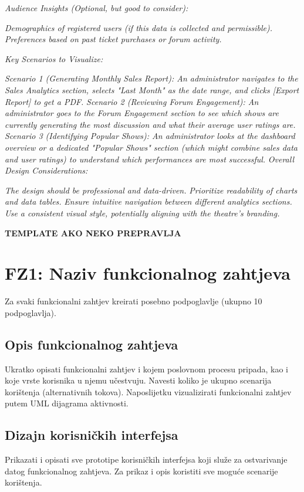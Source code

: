\begin{enumerate}[itemsep=1ex]
    \textit{Audience Insights (Optional, but good to consider):}
    
    \textit{Demographics of registered users (if this data is collected and permissible).}
    \textit{Preferences based on past ticket purchases or forum activity.}
    
    \textit{Key Scenarios to Visualize:}

    \textit{Scenario 1 (Generating Monthly Sales Report): An administrator navigates to the Sales Analytics section, selects "Last Month" as the date range, and clicks [Export Report] to get a PDF.}
    \textit{Scenario 2 (Reviewing Forum Engagement): An administrator goes to the Forum Engagement section to see which shows are currently generating the most discussion and what their average user ratings are.}
    \textit{Scenario 3 (Identifying Popular Shows): An administrator looks at the dashboard overview or a dedicated "Popular Shows" section (which might combine sales data and user ratings) to understand which performances are most successful.}
    \textit{Overall Design Considerations:}

    \textit{The design should be professional and data-driven.}
    \textit{Prioritize readability of charts and data tables.}
    \textit{Ensure intuitive navigation between different analytics sections.}
    \textit{Use a consistent visual style, potentially aligning with the theatre's branding.}

\end{enumerate}
\sloppy




\textbf{TEMPLATE AKO NEKO PREPRAVLJA}
\section{FZ1: Naziv funkcionalnog zahtjeva}

Za svaki funkcionalni zahtjev kreirati posebno podpoglavlje (ukupno 10 podpoglavlja).

\sloppy
\subsection{Opis funkcionalnog zahtjeva}

Ukratko opisati funkcionalni zahtjev i kojem poslovnom procesu pripada, kao i koje vrste korisnika u njemu učestvuju. Navesti koliko je ukupno scenarija korištenja (alternativnih tokova). Naposlijetku vizualizirati funkcionalni zahtjev putem UML dijagrama aktivnosti.

\sloppy
\subsection{Dizajn korisničkih interfejsa}

Prikazati i opisati sve prototipe korisničkih interfejsa koji služe za ostvarivanje datog funkcionalnog zahtjeva. Za prikaz i opis koristiti sve moguće scenarije korištenja.